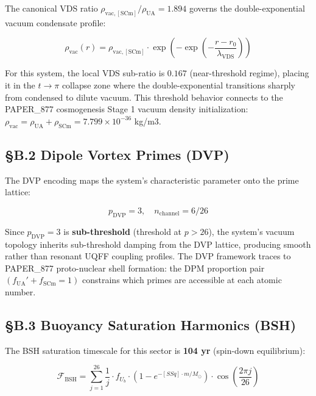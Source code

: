 \documentclass[12pt,a4paper]{article}
\begin{document}
The canonical VDS ratio $\rho_{\mathrm{vac,[SCm]}} / \rho_{\mathrm{UA}} = 1.894$ governs the double-exponential vacuum condensate profile:

\begin{equation}
\rho_{\mathrm{vac}}(r) = \rho_{\mathrm{vac,[SCm]}} \cdot \exp\!\left(-\exp\!\left(-\frac{r - r_0}{\lambda_{\mathrm{VDS}}}\right)\right)
\end{equation}

For this system, the local VDS sub-ratio is $0.167$ (near-threshold regime), placing it in the $t \to \pi$ collapse zone where the double-exponential transitions sharply from condensed to dilute vacuum. This threshold behavior connects to the PAPER\_877 cosmogenesis Stage 1 vacuum density initialization: $\rho_{\mathrm{vac}} = \rho_{\mathrm{UA}} + \rho_{\mathrm{SCm}} = 7.799 \times 10^{-36}$ kg/m3.

\subsection{\S{}B.2 Dipole Vortex Primes (DVP)}

The DVP encoding maps the system's characteristic parameter onto the prime lattice:

\begin{equation}
p_{\mathrm{DVP}} = 3, \quad n_{\mathrm{channel}} = 6/26
\end{equation}

Since $p_{\mathrm{DVP}} = 3$ is \textbf{sub-threshold} (threshold at $p > 26$), the system's vacuum topology inherits sub-threshold damping from the DVP lattice, producing smooth rather than resonant UQFF coupling profiles. The DVP framework traces to PAPER\_877 proto-nuclear shell formation: the DPM proportion pair $(f_{\mathrm{UA}}' + f_{\mathrm{SCm}} = 1)$ constrains which primes are accessible at each atomic number.

\subsection{\S{}B.3 Buoyancy Saturation Harmonics (BSH)}

The BSH saturation timescale for this sector is \textbf{104 yr} (spin-down equilibrium):

\begin{equation}
\mathcal{F}_{\mathrm{BSH}} = \sum_{j=1}^{26} \frac{1}{j} \cdot f_U_b \cdot \left(1 - e^{-[SSq] \cdot m/M_\odot}\right) \cdot \cos\!\left(\frac{2\pi j}{26}\right)
\end{equation}
\end{document}
